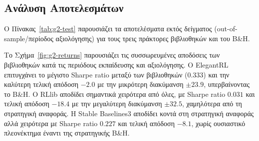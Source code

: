 \subsection{Ανάλυση Αποτελεσμάτων}
\label{subsec:exp-libraries-test}

Ο Πίνακας~\ref{tab:g2-test} παρουσιάζει τα αποτελέσματα εκτός δείγματος (out-of-sample/περίοδος αξιολόγησης) για τους τρεις 
πράκτορες βιβλιοθηκών και του Β\&Η.

\begin{table}[htbp]
  \centering
  \caption{Αποτελέσματα εκτός δείγματος για τους πράκτορες βιβλιοθηκών RL (PPO-MLP, ανταμοιβή PnL, περίοδος αξιολόγησης 2024--2025, μέσος $\pm$ τυπική απόκλιση 5 εκτελέσεων).}
  \label{tab:g2-test}
  \small
\end{table}

Το Σχήμα~\ref{fig:g2-returns} παρουσιάζει τις συσσωρευμένες αποδόσεις των βιβλιοθηκών κατά τις περιόδους εκπαίδευσης και 
αξιολόγησης. Ο ElegantRL επιτυγχάνει το μέγιστο Sharpe ratio μεταξύ των βιβλιοθηκών ($0{.}333$) 
και την καλύτερη τελική απόδοση $-2{.}0$ με την μικρότερη διακύμανση $\pm 23{.}9$, υπερβαίνοντας το B\&H. Ο RLlib αποδίδει σημαντικά 
χειρότερα από όλες, με Sharpe ratio $0{.}031$ και τελική απόδοση $-18{.}4$ με την μεγαλύτερη διακύμανση $\pm 32{.}5$, χαμηλότερα από τη στρατηγική αναφοράς. Η Stable Baselines3 
αποδίδει κοντά στη στρατηγική αναφοράς αλλά χειρότερα με Sharpe ratio $0{.}227$ και τελική απόδοση $-8{.}1$, χωρίς ουσιαστικό πλεονέκτημα έναντι 
της στρατηγικής B\&H. 

